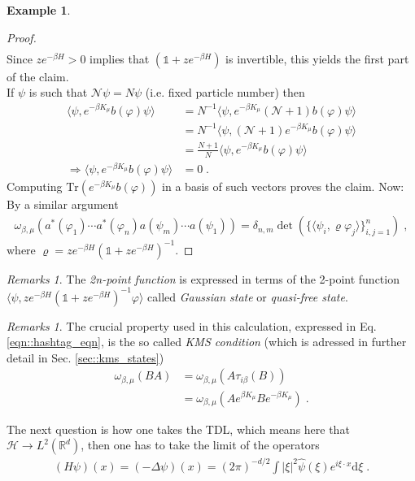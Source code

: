 \documentclass[
a4paper, %
11pt, %
onecolumn, %
openany, %
]{memoir}
\theoremstyle{definition}
\newtheorem{example}[definition]{Example}
\theoremstyle{remark}
\newtheorem{remarks}[definition]{Remarks}
\theoremstyle{plain}
\begin{document}
\begin{example}
\begin{proof}
\begin{align}
	\end{align}
Since $ze^{-\beta H}>0$ implies that $(\mathds{1}+ze^{-\beta H})$ is invertible, this yields the first part of the claim.\\
	If $\psi$ is such that $\mathcal{N}\psi= N\psi$ (i.e. fixed particle number) then \begin{align}
	\langle \psi,e^{-\beta K_{\mu}}b(\varphi)\psi\rangle &={N}^{-1}\langle \psi , e^{-\beta K_{\mu}}(\mathcal{N}+1)b(\varphi)\psi\rangle\\
	&= N^{-1}\langle \psi, (\mathcal{N}+1)e^{-\beta K_{\mu}}b(\varphi)\psi\rangle\\
	&=\frac{N+1}{N}\langle \psi, e^{-\beta K_{\mu}}b(\varphi)\psi\rangle\\
	\Rightarrow \langle \psi,e^{-\beta K_{\mu}}b(\varphi)\psi\rangle&=0\; .
	\end{align}
	Computing $\mathrm{Tr}(e^{-\beta K_{\mu}}b(\varphi))$ in a basis of such vectors proves the claim. Now: By a similar argument \begin{align}
	\omega_{\beta,\mu}(a^*(\varphi_1)\cdots a^{*}(\varphi_n)a(\psi_m)\cdots a(\psi_1))=\delta_{n,m}\det\left(\{\langle\psi_i,\varrho\varphi_j\rangle\}_{i,j=1}^{n}\right)\; ,	\end{align}
$\text{where }\varrho = ze^{-\beta H}(\mathds{1}+ze^{-\beta H})^{-1}$.
\end{proof}
\end{example}
\begin{remarks}
	The \textit{2n-point function} is expressed in terms of the 2-point function $\langle \psi, ze^{-\beta H}(\mathds{1}+ze^{-\beta H})^{-1}\varphi\rangle$ called \textit{Gaussian state} or \textit{quasi-free state}.
\end{remarks}
\begin{remarks}
	The crucial property used in this calculation, expressed in Eq. \eqref{eqn::hashtag_eqn}, is the so called \textit{KMS condition} (which is adressed in further detail in Sec. \ref{sec::kms_states}) \begin{align}
	\omega_{\beta,\mu}(BA)&=\omega_{\beta,\mu}(A\tau_{i\beta}(B))\\
	&=\omega_{\beta,\mu}(Ae^{\beta K_{\mu}}Be^{-\beta K_{\mu}})\; .
	\end{align}
\end{remarks}
The next question is how one takes the TDL, which means here that $\mathcal{H}\rightarrow L^2(\mathbb{R}^d)$, then one has to take the limit of the operators \begin{align}
(H\psi)(x)=(-\Delta \psi)(x)=(2\pi)^{-d/2}\int |\xi|^2\hat{\psi}(\xi)e^{i\xi\cdot x}\mathrm{d}\xi\; .
\end{align}
\end{document}
